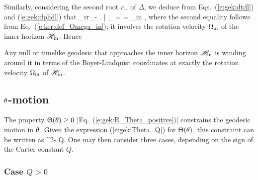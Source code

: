 Similarly, considering the second root $r_-$ of $\Delta$, we deduce
from
Eqs.~(\ref{e:gek:dtdl}) and
(\ref{e:gek:dphdl}) that
\be
    \lim_{r\to r_-} \left.  \right| _{\Li} =  = \Omega_{\rm in} ,
\ee
where the second equality follows from Eq.~(\ref{e:ker:def_Omega_in}); it involves
the rotation velocity $\Omega_{\rm in}$ of the inner horizon $\mathscr{H}_{\rm in}$.
Hence
\begin{greybox}
Any null or timelike geodesic that approaches the inner horizon $\mathscr{H}_{\rm in}$
is winding around it in terms of the Boyer-Lindquist coordinates at exactly the
rotation velocity $\Omega_{\rm in}$ of $\mathscr{H}_{\rm in}$.
\end{greybox}

\subsection{$\theta$-motion}

The property $\Theta(\theta) \geq 0$ [Eq.~(\ref{e:gek:R_Theta_positive})]
constrains the geodesic motion in $\theta$. Given the expression (\ref{e:gek:Theta_Q})
for $\Theta(\theta)$, this constraint can be written as
\be \label{e:gek:cond_th_motion}
    \cos^2\th {} \geq - Q.
\ee
One may then consider three cases, depending on the sign of the Carter constant $Q$.

\subsubsection{Case $Q > 0$}

